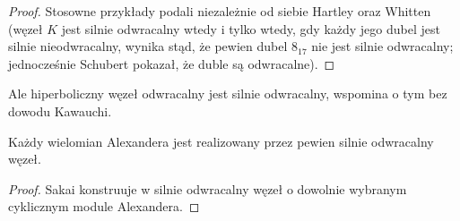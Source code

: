 \begin{proof}
%
%
    Stosowne przykłady podali niezależnie od siebie Hartley \cite[s. 183]{hartley1980} oraz Whitten \cite{whitten1981} (węzeł $K$ jest silnie odwracalny wtedy i tylko wtedy, gdy każdy jego dubel jest silnie nieodwracalny, wynika stąd, że pewien dubel $8_{17}$ nie jest silnie odwracalny; jednocześnie Schubert \cite[s. 235]{schubert1953} pokazał, że duble są odwracalne).
\end{proof}

Ale hiperboliczny węzeł odwracalny jest silnie odwracalny, wspomina o tym bez dowodu Kawauchi.

\begin{proposition}
    Każdy wielomian Alexandera jest realizowany przez pewien silnie odwracalny węzeł.
\end{proposition}

\begin{proof}
%
    Sakai konstruuje w \cite{sakai1983} silnie odwracalny węzeł o dowolnie wybranym cyklicznym module Alexandera.
\end{proof}


